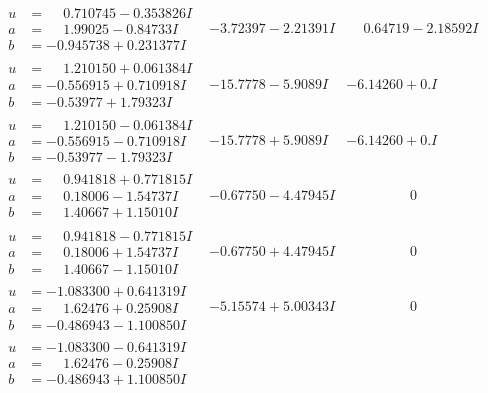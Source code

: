 \documentclass[1p]{elsarticle_modified}
\theoremstyle{definition}
\begin{document}
$$\begin{array}{c|c|c}
\begin{aligned}
u &= \phantom{-}0.710745 - 0.353826 I \\
a &= \phantom{-}1.99025 - 0.84733 I \\
b &= -0.945738 + 0.231377 I\end{aligned}
 & -3.72397 - 2.21391 I & \phantom{-}0.64719 - 2.18592 I \\ \hline\begin{aligned}
u &= \phantom{-}1.210150 + 0.061384 I \\
a &= -0.556915 + 0.710918 I \\
b &= -0.53977 + 1.79323 I\end{aligned}
 & -15.7778 - 5.9089 I & -6.14260 + 0. I\phantom{ +0.000000I} \\ \hline\begin{aligned}
u &= \phantom{-}1.210150 - 0.061384 I \\
a &= -0.556915 - 0.710918 I \\
b &= -0.53977 - 1.79323 I\end{aligned}
 & -15.7778 + 5.9089 I & -6.14260 + 0. I\phantom{ +0.000000I} \\ \hline\begin{aligned}
u &= \phantom{-}0.941818 + 0.771815 I \\
a &= \phantom{-}0.18006 - 1.54737 I \\
b &= \phantom{-}1.40667 + 1.15010 I\end{aligned}
 & -0.67750 - 4.47945 I & \phantom{-0.000000 } 0 \\ \hline\begin{aligned}
u &= \phantom{-}0.941818 - 0.771815 I \\
a &= \phantom{-}0.18006 + 1.54737 I \\
b &= \phantom{-}1.40667 - 1.15010 I\end{aligned}
 & -0.67750 + 4.47945 I & \phantom{-0.000000 } 0 \\ \hline\begin{aligned}
u &= -1.083300 + 0.641319 I \\
a &= \phantom{-}1.62476 + 0.25908 I \\
b &= -0.486943 - 1.100850 I\end{aligned}
 & -5.15574 + 5.00343 I & \phantom{-0.000000 } 0 \\ \hline\begin{aligned}
u &= -1.083300 - 0.641319 I \\
a &= \phantom{-}1.62476 - 0.25908 I \\
b &= -0.486943 + 1.100850 I\end{aligned}

\end{array}$$
\end{document}
